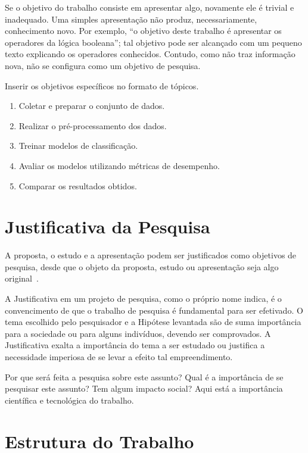 \documentclass[
	12pt,				    %
	openright,			    %
	oneside,			    %
	a4paper,			    %
    sumario=tradicional,    %
	english,			    %
	brazil,				    %
	]{abntex2}
\let\cite\parencite
\begin{document}
Se o objetivo do trabalho consiste em apresentar algo, novamente ele é trivial e inadequado. Uma simples apresentação não produz, necessariamente, conhecimento novo. Por exemplo, ``o objetivo deste trabalho é apresentar os operadores da lógica booleana''; tal objetivo pode ser alcançado com um pequeno texto explicando os operadores conhecidos. Contudo, como não traz informação nova, não se configura como um objetivo de pesquisa.

Inserir os objetivos específicos no formato de tópicos.

\begin{enumerate}
    \item[a)] Coletar e preparar o conjunto de dados.
    \item[b)] Realizar o pré-processamento dos dados.
    \item[c)] Treinar modelos de classificação.
    \item[d)] Avaliar os modelos utilizando métricas de desempenho.
    \item[e)] Comparar os resultados obtidos.
\end{enumerate}

\section{Justificativa da Pesquisa}\label{sec:Justificativa}

A proposta, o estudo e a apresentação podem ser justificados como objetivos de pesquisa, desde que o objeto da proposta, estudo ou apresentação seja algo original~\cite{wazlawick2009}.

A Justificativa em um projeto de pesquisa, como o próprio nome indica, é o convencimento de que o trabalho de pesquisa é fundamental para ser efetivado. O tema escolhido pelo pesquisador e a Hipótese levantada são de suma importância para a sociedade ou para alguns indivíduos, devendo ser comprovados. A Justificativa exalta a importância do tema a ser estudado ou justifica a necessidade imperiosa de se levar a efeito tal empreendimento.

Por que será feita a pesquisa sobre este assunto? Qual é a importância de se pesquisar este assunto? Tem algum impacto social? Aqui está a importância científica e tecnológica do trabalho.
 
\section{Estrutura do Trabalho}\label{sec:Organizacao}
\end{document}
